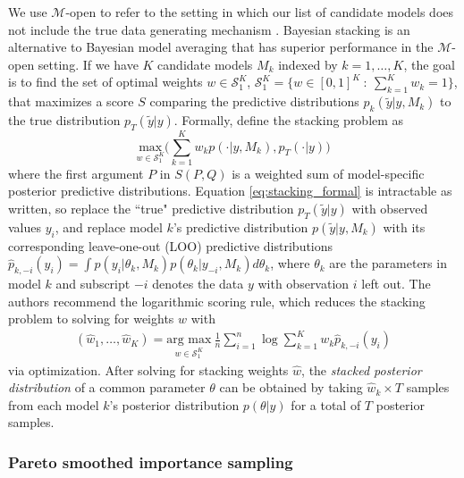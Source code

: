 \documentclass[12pt]{article}   	%
\numberwithin{equation}{section}
\begin{document}
We use $\mathcal{M}$-open to refer to the setting in which our list of candidate models does not include the true data generating mechanism \citep{bernardo2009}. Bayesian stacking \citep{yao2018stacking} is an alternative to Bayesian model averaging that has superior performance in the $\mathcal{M}$-open setting. If we have $K$ candidate models $M_k$ indexed by $k = 1, \dots, K$, the goal is to find the set of optimal weights $w \in \mathcal{S}_1^K$, $\mathcal{S}_1^K = \{w \in [0,1]^K \: : \: \sum_{k = 1}^K w_k = 1\}$, that maximizes a score $S$ comparing the predictive distributions  $p_k(\tilde{y} \vert y, M_k)$ to the true distribution $p_T(\tilde{y} \vert y)$. Formally, \citet{yao2018stacking} define the stacking problem as 
\begin{equation}
\underset{w \in \mathcal{S}_1^K}{\text{max}}\Big( \sum_{k=1}^K w_k p(\cdot \vert y, M_k) , p_T(\cdot \vert y) \Big) \label{eq:stacking_formal}
\end{equation}
where the first argument $P$ in $S(P, Q)$ is a weighted sum of model-specific posterior predictive distributions. Equation \eqref{eq:stacking_formal} is intractable as written, so \citet{yao2018stacking} replace the ``true" predictive distribution $p_T(\tilde{y} \vert y)$ with observed values $y_i$, and replace model $k$'s predictive distribution $p(\tilde{y} \vert y, M_k)$ with its corresponding leave-one-out (LOO) predictive distributions $\hat{p}_{k, -i}(y_i) = \int p(y_i \vert \theta_k, M_k) p(\theta_k \vert y_{-i}, M_k) d\theta_k$, where $\theta_k$ are the parameters in model $k$ and subscript $-i$ denotes the data $y$ with observation $i$ left out. The authors recommend the logarithmic scoring rule, which reduces the stacking problem to solving for weights $w$ with
\begin{align}
(\hat{w}_1, \dots, \hat{w}_K) = \underset{w \in \mathcal{S}_1^K}{\mbox{arg max}} \: \frac{1}{n} \sum_{i = 1}^n \log \sum_{k = 1}^K w_k \hat{p}_{k, -i}(y_i)
\end{align}
via optimization. After solving for stacking weights $\hat{w}$, the \textit{stacked posterior distribution} of a common parameter $\theta$ can be obtained by taking $\hat{w}_k \times T$ samples from each model $k$'s posterior distribution $p(\theta \vert y)$ for a total of $T$ posterior samples. 

\subsubsection{Pareto smoothed importance sampling}
\end{document}
